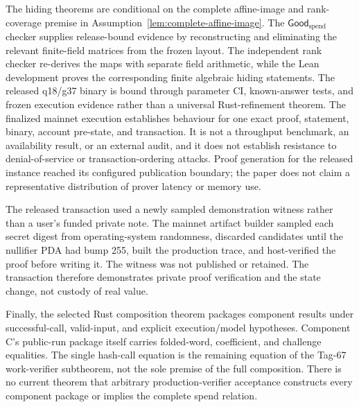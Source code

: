 The hiding theorems are conditional on the complete affine-image and
rank-coverage premise in Assumption~\ref{lem:complete-affine-image}.  The
\(\mathsf{Good}_{\mathrm{spend}}\) checker supplies release-bound evidence by reconstructing
and eliminating the relevant finite-field matrices from the frozen layout.
The independent rank checker re-derives the maps with separate field
arithmetic, while the Lean development proves the corresponding finite
algebraic hiding statements. The released q18/g37 binary is bound through
parameter CI, known-answer tests, and frozen execution evidence rather than a
universal Rust-refinement theorem.
The finalized mainnet execution establishes behaviour for one exact proof,
statement, binary, account pre-state, and transaction.  It is not a throughput
benchmark, an availability result, or an external audit, and it does not
establish resistance to denial-of-service or transaction-ordering attacks.
Proof generation for the released instance reached its configured publication
boundary; the paper does not claim a representative distribution of prover
latency or memory use.

The released transaction used a newly sampled demonstration witness rather
than a user's funded private note.  The mainnet artifact builder sampled each
secret digest from operating-system randomness, discarded candidates until the
nullifier PDA had bump 255, built the production trace, and host-verified the
proof before writing it.  The witness was not published or retained.  The
transaction therefore demonstrates private proof verification and the state
change, not custody of real value.

Finally, the selected Rust composition theorem packages component results
under successful-call, valid-input, and explicit execution/model
hypotheses.  Component C's public-run package itself carries folded-word,
coefficient, and challenge equalities.  The single hash-call equation is the
remaining equation of the Tag-67 work-verifier subtheorem, not the sole
premise of the full composition.  There is no current theorem that arbitrary
production-verifier acceptance constructs every component package or implies
the complete spend relation.
